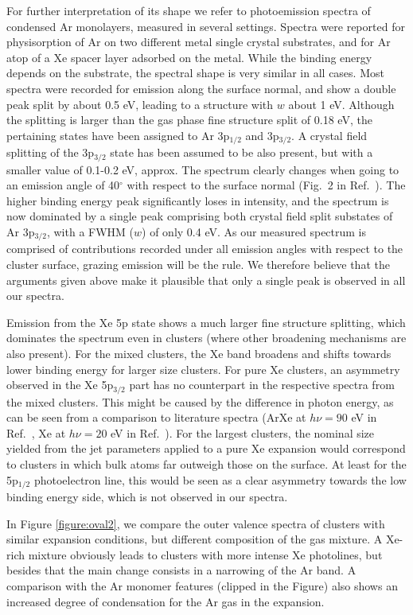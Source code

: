 For further interpretation of its shape we refer to photoemission spectra of condensed Ar monolayers, measured in several settings.\cite{jacobi,jacobi2}
Spectra were reported for physisorption of Ar on two different metal single crystal substrates, and for Ar atop of a Xe spacer layer adsorbed on the metal.
While the binding energy depends on the substrate, the spectral shape is very similar in all cases. 
Most spectra were recorded for emission along the surface normal, and show a double peak split by about 0.5 eV, leading to a structure with $w$ about 1 eV.
Although the splitting is larger than the gas phase fine structure split of 0.18 eV, the pertaining states have been assigned to Ar 3p$_{1/2}$ and 3p$_{3/2}$.
A crystal field splitting of the 3p$_{3/2}$ state has been assumed to be also present, but with a smaller value of 0.1-0.2 eV, approx.\cite{jacobi2} 
The spectrum clearly changes when going to an emission angle of 40$^\circ$ with respect to the surface normal (Fig.\ 2 in Ref.\ ).
The higher binding energy peak significantly loses in intensity, and the spectrum is now dominated by a single peak comprising both crystal field split substates of Ar 3p$_{3/2}$, with a FWHM ($w$) of only 0.4 eV.
As our measured spectrum is comprised of contributions recorded under all emission angles with respect to the cluster surface, grazing emission will be the rule.
We therefore believe that the arguments given above make it plausible that only a single peak is observed in all our spectra.

Emission from the Xe 5p state shows a much larger fine structure splitting, which dominates the spectrum even in clusters (where other broadening mechanisms are also present). 
For the mixed clusters, the Xe band broadens and shifts towards lower binding energy for larger size clusters. 
For pure Xe clusters, an asymmetry observed in the Xe 5p$_{3/2}$ part has no counterpart in the respective spectra from the mixed clusters.
This might be caused by the difference in photon energy, as can be seen from a comparison to literature spectra (ArXe at $h\nu = 90$ eV in Ref.\ \cite{lindblad}, Xe at $h\nu = 20$ eV in Ref.\ \cite{rolles}).
For the largest clusters, the nominal size yielded from the jet parameters applied to a pure Xe expansion would correspond to clusters in which bulk atoms far outweigh those on the surface.
At least for the 5p$_{1/2}$ photoelectron line, this would be seen as a clear asymmetry towards the low binding energy side, which is not observed in our spectra.

In Figure \ref{figure:oval2}, we compare the outer valence spectra of clusters with similar expansion conditions, but different composition of the gas mixture.
A Xe-rich mixture obviously leads to clusters with more intense Xe photolines, but besides that the main change consists in a narrowing of the Ar band.
A comparison with the Ar monomer features (clipped in the Figure) also shows an increased degree of condensation for the Ar gas in the expansion.

